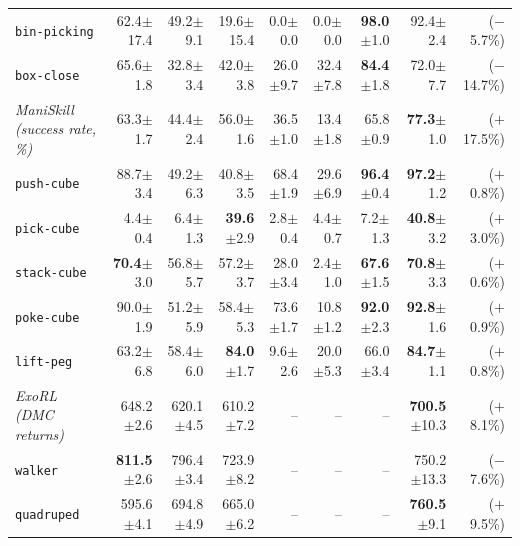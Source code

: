 \documentclass{article}\usepackage[margin=1in]{geometry}\usepackage{booktabs,graphicx,xcolor,amsmath}
\newcommand{\pmse}[1]{{\scriptsize$\pm$#1}}\newcommand{\name}{Density-FB}\newcommand{\cref}[1]{}
\begin{document}
\begin{table}[htb]
{\begin{tabular}{lrrrrrrrr}
    \texttt{bin-picking}                   & 62.4\pmse{17.4} & 49.2\pmse{9.1} & 19.6\pmse{15.4} & 0.0\pmse{0.0} & 0.0\pmse{0.0} & \textbf{98.0}\pmse{1.0} & 92.4\pmse{2.4} & \textcolor[RGB]{125,82,82}{($-$5.7\%)} \\
    \texttt{box-close}                     & 65.6\pmse{1.8} & 32.8\pmse{3.4} & 42.0\pmse{3.8} & 26.0\pmse{9.7} & 32.4\pmse{7.8} & \textbf{84.4}\pmse{1.8} & 72.0\pmse{7.7} & \textcolor[RGB]{165,53,53}{($-$14.7\%)} \\
    \midrule
    \textit{ManiSkill (success rate, \%)}  & 63.3\pmse{1.7} & 44.4\pmse{2.4} & 56.0\pmse{1.6} & 36.5\pmse{1.0} & 13.4\pmse{1.8} & 65.8\pmse{0.9} & \textbf{77.3}\pmse{1.0} & \textcolor[RGB]{30,135,58}{($+$17.5\%)} \\
    \midrule
    \texttt{push-cube}                     & 88.7\pmse{3.4} & 49.2\pmse{6.3} & 40.8\pmse{3.5} & 68.4\pmse{1.9} & 29.6\pmse{6.9} & \textbf{96.4}\pmse{0.4} & \textbf{97.2}\pmse{1.2} & \textcolor[RGB]{97,102,98}{($+$0.8\%)} \\
    \texttt{pick-cube}                     & 4.4\pmse{0.4} & 6.4\pmse{1.3} & \textbf{39.6}\pmse{2.9} & 2.8\pmse{0.4} & 4.4\pmse{0.7} & 7.2\pmse{1.3} & \textbf{40.8}\pmse{3.2} & \textcolor[RGB]{88,106,93}{($+$3.0\%)} \\
    \texttt{stack-cube}                    & \textbf{70.4}\pmse{3.0} & 56.8\pmse{5.7} & 57.2\pmse{3.7} & 28.0\pmse{3.4} & 2.4\pmse{1.0} & \textbf{67.6}\pmse{1.5} & \textbf{70.8}\pmse{3.3} & \textcolor[RGB]{98,101,99}{($+$0.6\%)} \\
    \texttt{poke-cube}                     & 90.0\pmse{1.9} & 51.2\pmse{5.9} & 58.4\pmse{5.3} & 73.6\pmse{1.7} & 10.8\pmse{1.2} & \textbf{92.0}\pmse{2.3} & \textbf{92.8}\pmse{1.6} & \textcolor[RGB]{97,102,98}{($+$0.9\%)} \\
    \texttt{lift-peg}                      & 63.2\pmse{6.8} & 58.4\pmse{6.0} & \textbf{84.0}\pmse{1.7} & 9.6\pmse{2.6} & 20.0\pmse{5.3} & 66.0\pmse{3.4} & \textbf{84.7}\pmse{1.1} & \textcolor[RGB]{97,102,98}{($+$0.8\%)} \\
    \midrule
    \textit{ExoRL (DMC returns)}           & 648.2\pmse{2.6} & 620.1\pmse{4.5} & 610.2\pmse{7.2} & -- & -- & -- & \textbf{700.5}\pmse{10.3} & \textcolor[RGB]{68,116,81}{($+$8.1\%)} \\
    \midrule
    \texttt{walker}                        & \textbf{811.5}\pmse{2.6} & 796.4\pmse{3.4} & 723.9\pmse{8.2} & -- & -- & -- & 750.2\pmse{13.3} & \textcolor[RGB]{133,76,76}{($-$7.6\%)} \\
    \texttt{quadruped}                     & 595.6\pmse{4.1} & 694.8\pmse{4.9} & 665.0\pmse{6.2} & -- & -- & -- & \textbf{760.5}\pmse{9.1} & \textcolor[RGB]{62,119,77}{($+$9.5\%)} \\

\end{tabular}}
\end{table}
\end{document}
